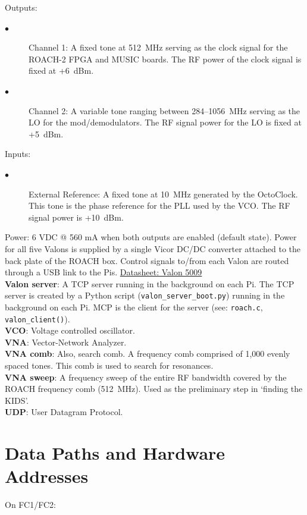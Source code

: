 Outputs:
\begin{description}
  \item[$\bullet$] Channel 1: A fixed tone at 512~MHz serving as the clock signal for the ROACH-2 FPGA and MUSIC boards. The RF power of the clock signal is fixed at +6~dBm.
  \item[$\bullet$] Channel 2: A variable tone ranging between 284--1056~MHz serving as the LO for the mod/demodulators. The RF signal power for the LO is fixed at +5~dBm.
\end{description}
Inputs:
\begin{description}
  \item[$\bullet$] External Reference: A fixed tone at 10~MHz generated by the OctoClock. This tone is the phase reference for the PLL used by the VCO\@. The RF signal power is +10~dBm.
\end{description}
Power: 6 VDC @ 560 mA when both outputs are enabled (default state). Power for all five Valons is supplied by a single Vicor DC/DC converter attached to the back plate of the ROACH box. Control signals to/from each Valon are routed through a USB link to the Pis.
\href{https://www.valonrf.com/uploads/1/1/7/3/117370920/5009_datasheet_v1.34_20181113_ljr.pdf}{Datasheet: Valon 5009}\\
\textbf{Valon server}: A TCP server running in the background on each Pi. The TCP server is created by a Python script (\texttt{valon\_server\_boot.py}) running in the background on each Pi. MCP is the client for the server (see: \texttt{roach.c}, \texttt{valon\_client()}).\\
\textbf{VCO}: Voltage controlled oscillator.\\
\textbf{VNA}: Vector-Network Analyzer.\\
\textbf{VNA comb}: Also, search comb. A frequency comb comprised of 1,000 evenly spaced tones. This comb is used to search for resonances.\\
\textbf{VNA sweep}: A frequency sweep of the entire RF bandwidth covered by the ROACH frequency comb (512~MHz). Used as the preliminary step in `finding the KIDS'.\\
\textbf{UDP}: User Datagram Protocol.

\section{Data Paths and Hardware Addresses}\label{data_paths}
\noindent On FC1/FC2:\\

